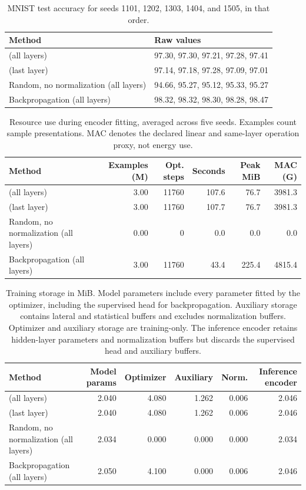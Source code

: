 \begin{table}[H]
\centering
\small
\caption{MNIST test accuracy for seeds 1101, 1202, 1303, 1404, and 1505, in that order.}
\label{tab:mnist-raw}
\begin{tabular}{ll}
\toprule
Method & Raw values \\
\midrule
\TeReLOffline{} (all layers) & 97.30, 97.30, 97.21, 97.28, 97.41 \\
\TeReLOffline{} (last layer) & 97.14, 97.18, 97.28, 97.09, 97.01 \\
Random, no normalization (all layers) & 94.66, 95.27, 95.12, 95.33, 95.27 \\
Backpropagation (all layers) & 98.32, 98.32, 98.30, 98.28, 98.47 \\
\bottomrule
\end{tabular}
\end{table}

\begin{table}[H]
\centering
\small
\caption{Resource use during encoder fitting, averaged across five seeds. Examples count sample presentations. MAC denotes the declared linear and same-layer operation proxy, not energy use.}
\label{tab:encoder-resources}
\begin{tabular}{lrrrrr}
\toprule
Method & Examples (M) & Opt. steps & Seconds & Peak MiB & MAC (G) \\
\midrule
\TeReLOffline{} (all layers) & 3.00 & 11760 & 107.6 & 76.7 & 3981.3 \\
\TeReLOffline{} (last layer) & 3.00 & 11760 & 107.7 & 76.7 & 3981.3 \\
Random, no normalization (all layers) & 0.00 & 0 & 0.0 & 0.0 & 0.0 \\
Backpropagation (all layers) & 3.00 & 11760 & 43.4 & 225.4 & 4815.4 \\
\bottomrule
\end{tabular}
\end{table}

\begin{table}[H]
\centering
\small
\caption{Training storage in MiB. Model parameters include every parameter fitted by the optimizer, including the supervised head for backpropagation. Auxiliary storage contains \TeReLOffline{} lateral and statistical buffers and excludes normalization buffers. Optimizer and auxiliary storage are training-only. The inference encoder retains hidden-layer parameters and normalization buffers but discards the supervised head and auxiliary buffers.}
\label{tab:training-state-decomposition}
\setlength{\tabcolsep}{4pt}
\begin{tabular}{lrrrrr}
\toprule
Method & Model params & Optimizer & Auxiliary & Norm. & Inference encoder \\
\midrule
\TeReLOffline{} (all layers) & 2.040 & 4.080 & 1.262 & 0.006 & 2.046 \\
\TeReLOffline{} (last layer) & 2.040 & 4.080 & 1.262 & 0.006 & 2.046 \\
Random, no normalization (all layers) & 2.034 & 0.000 & 0.000 & 0.000 & 2.034 \\
Backpropagation (all layers) & 2.050 & 4.100 & 0.000 & 0.006 & 2.046 \\
\bottomrule
\end{tabular}
\end{table}
